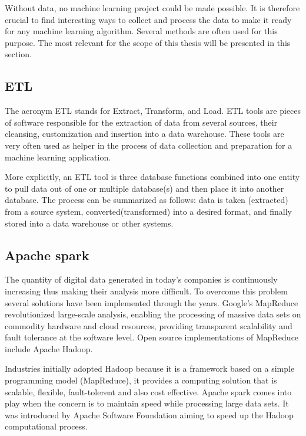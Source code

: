 \documentclass[LaM,binding=0.6cm, english]{sapthesis}
\begin{document}
Without data, no machine learning project could be made possible. It is therefore crucial to find interesting ways to collect and process the data to make it ready for any machine learning algorithm. Several methods are often used for this purpose. The most relevant for the scope of this thesis will be presented in this section. 

\subsection{ETL}

The acronym ETL stands for Extract, Transform, and Load. ETL tools are pieces of software responsible for the extraction of data from several sources, their cleansing, customization and insertion into a data warehouse.\cite{Vassiliadis2002} These tools are very often used as helper in the process of data collection and preparation for a machine learning application.

\par More explicitly, an ETL tool is three database functions combined into one entity to pull data out of one or multiple database(s) and then place it into another database. The process can be summarized as follows: data is taken (extracted) from a source system, converted(transformed) into a desired format, and finally stored into a data warehouse or other systems.

\subsection{Apache spark} \label{spark}

The quantity of digital data generated in today's companies is continuously increasing thus making their analysis more difficult. To overcome this problem several solutions have been implemented through the years. Google’s MapReduce revolutionized large-scale analysis, enabling the processing of massive data sets on commodity hardware and cloud resources, providing transparent scalability and fault tolerance at the software level.\cite{Capuccini2017} Open source implementations of MapReduce include Apache Hadoop.

\par Industries initially adopted Hadoop because it is a framework based on a simple programming model (MapReduce), it provides a computing solution that is scalable, flexible, fault-tolerent and also cost effective. Apache spark comes into play when the concern is to maintain speed while processing large data sets. It was introduced by Apache Software Foundation aiming to speed up the Hadoop computational process.
\end{document}
